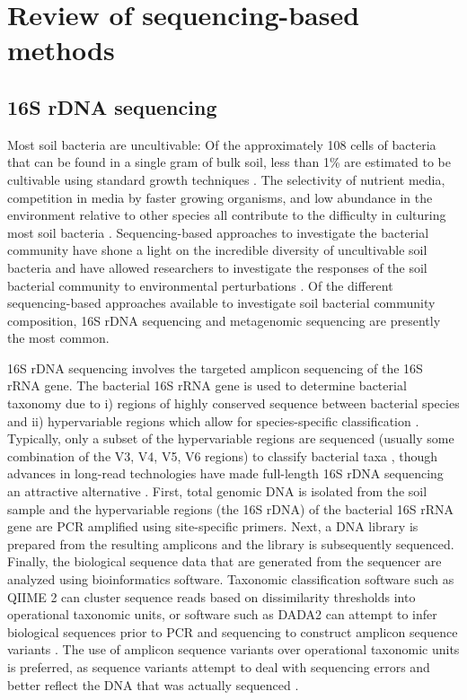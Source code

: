 \section{Review of sequencing-based methods}

\subsection{16S rDNA sequencing}

Most soil bacteria are uncultivable:
Of the approximately 108 cells of bacteria that can be found in a single gram of bulk soil, less than 1\% are estimated to be cultivable using standard growth techniques \parencite{Raynaud.2014, vanPham.2012}.
The selectivity of nutrient media, competition in media by faster growing organisms, and low abundance in the environment relative to other species all contribute to the difficulty in culturing most soil bacteria \parencite[229–300]{vanElsas.2019b}.
Sequencing-based approaches to investigate the bacterial community have shone a light on the incredible diversity of uncultivable soil bacteria \parencite{Hug.2016} and have allowed researchers to investigate the responses of the soil bacterial community to environmental perturbations \parencite{Isobe.2019, Isobe.2020}.
Of the different sequencing-based approaches available to investigate soil bacterial community composition, 16S rDNA sequencing and metagenomic sequencing are presently the most common.

16S rDNA sequencing involves the targeted amplicon sequencing of the 16S rRNA gene.
The bacterial 16S rRNA gene is used to determine bacterial taxonomy due to i) regions of highly conserved sequence between bacterial species and ii) hypervariable regions which allow for species-specific classification \parencite{vanPham.2012}.
Typically, only a subset of the hypervariable regions are sequenced (usually some combination of the V3, V4, V5, V6 regions) to classify bacterial taxa \parencite{Yang.2016}, though advances in long-read technologies have made full-length 16S rDNA sequencing an attractive alternative \parencite{Shin.2016, Numberger.2019}.
First, total genomic DNA is isolated from the soil sample and the hypervariable regions (the 16S rDNA) of the bacterial 16S rRNA gene are PCR amplified using site-specific primers.
Next, a DNA library is prepared from the resulting amplicons and the library is subsequently sequenced.
Finally, the biological sequence data that are generated from the sequencer are analyzed using bioinformatics software.
Taxonomic classification software such as QIIME 2 can cluster sequence reads based on dissimilarity thresholds into operational taxonomic units, or software such as DADA2 can attempt to infer biological sequences prior to PCR and sequencing to construct amplicon sequence variants \parencite{Bolyen.2019, Callahan.2016}.
The use of amplicon sequence variants over operational taxonomic units is preferred, as sequence variants attempt to deal with sequencing errors and better reflect the DNA that was actually sequenced \parencite{Callahan.2017}.

